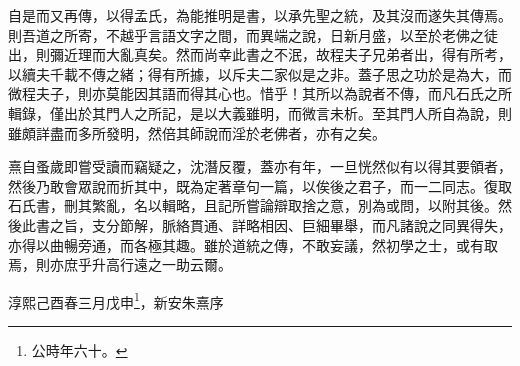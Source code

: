 \documentclass[hyperref, UTF8, 12pt, a4paper]{ctexrep}
\begin{document}
自是而又再傳，以得孟氏，為能推明是書，以承先聖之統，及其沒而遂失其傳焉。則吾道之所寄，不越乎言語文字之間，而異端之說，日新月盛，以至於老佛之徒出，則彌近理而大亂真矣。然而尚幸此書之不泯，故程夫子兄弟者出，得有所考，以續夫千載不傳之緒；得有所據，以斥夫二家似是之非。蓋子思之功於是為大，而微程夫子，則亦莫能因其語而得其心也。惜乎！其所以為說者不傳，而凡石氏之所輯錄，僅出於其門人之所記，是以大義雖明，而微言未析。至其門人所自為說，則雖頗詳盡而多所發明，然倍其師說而淫於老佛者，亦有之矣。

熹自蚤歲即嘗受讀而竊疑之，沈潛反覆，蓋亦有年，一旦恍然似有以得其要領者，然後乃敢會眾說而折其中，既為定著章句一篇，以俟後之君子，而一二同志。復取石氏書，刪其繁亂，名以輯略，且記所嘗論辯取捨之意，別為或問，以附其後。然後此書之旨，支分節解，脈絡貫通、詳略相因、巨細畢舉，而凡諸說之同異得失，亦得以曲暢旁通，而各極其趣。雖於道統之傳，不敢妄議，然初學之士，或有取焉，則亦庶乎升高行遠之一助云爾。

淳熙己酉春三月戊申\footnote{公時年六十。}，新安朱熹序
\end{document}
